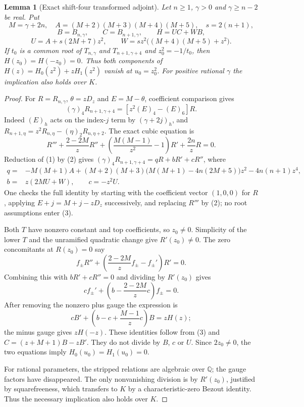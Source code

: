 \documentclass[11pt]{article}
\newtheorem{lemma}{Lemma}
\newcommand{\Q}{\mathbb Q}
\begin{document}
\begin{lemma}[Exact shift-four transformed adjoint]
\label{lem:offset-four-transform}
Let $n\ge1$, $\gamma>0$ and $\gamma\ge n-2$ be real. Put
\[
 M=\gamma+2n,\quad A=(M+2)(M+3)(M+4)(M+5),\quad s=2(n+1),
\]
\[
 B=B_{n,\gamma},\qquad C=B_{n+1,\gamma},\qquad H=UC+WB,
\]
\[
 U=A+s(2M+7)z^2,\qquad W=sz^2\bigl((M+4)(M+5)+z^2\bigr).
\]
If $t_0$ is a common root of $T_{n,\gamma}$ and
$T_{n+1,\gamma+4}$ and $z_0^2=-1/t_0$, then
$H(z_0)=H(-z_0)=0$.
Thus both components of $H(z)=H_0(z^2)+zH_1(z^2)$ vanish at
$u_0=z_0^2$. For positive rational $\gamma$ the implication
also holds over $K$.
\end{lemma}
\begin{proof}
For $R=R_{n,\gamma}$, $\theta=zD_z$ and $E=M-\theta$,
coefficient comparison gives
\[
 (\gamma)_4R_{n+1,\gamma+4}=[z^2(E)_4-(E)_6]R.       \tag{1}
\]
Indeed $(E)_h$ acts on the index-$j$ term by
$(\gamma+2j)_h$, and
$R_{n+1,\eta}=z^2R_{n,\eta}-(\eta)_2R_{n,\eta+2}$.
The exact cubic equation is
\[
 R'''+\frac{2-2M}{z}R''
 +\left(\frac{M(M-1)}{z^2}-1\right)R'
 +\frac{2n}{z}R=0.                                  \tag{2}
\]
Reduction of (1) by (2) gives
$(\gamma)_4R_{n+1,\gamma+4}=qR+bR'+cR''$, where
\[
 \begin{split}
 q={}&-M(M+1)A
 +(M+2)(M+3)\bigl(M(M+1)-4n(2M+5)\bigr)z^2
 -4n(n+1)z^4,\\
 b={}&z(2MU+W),\qquad c=-z^2U.
 \end{split}                                         \tag{3}
\]
One checks the full identity by starting with the coefficient vector
$(1,0,0)$ for $R$, applying $E+j=M+j-zD_z$ successively, and
replacing $R'''$ by (2); no root assumptions enter (3).

Both $T$ have nonzero constant and top coefficients, so $z_0\ne0$.
Simplicity of the lower $T$ and the unramified quadratic change give
$R'(z_0)\ne0$. The zero concomitants at $R(z_0)=0$ say
\[
 f_\pm R''+
 \left(\frac{2-2M}{z}f_\pm-f_\pm'\right)R'=0.
\]
Combining this with $bR'+cR''=0$ and dividing by $R'(z_0)$ gives
\[
 c f_\pm'+\left(b-\frac{2-2M}{z}c\right)f_\pm=0.
\]
After removing the nonzero plus gauge the expression is
\[
 cB'+\left(b-c+\frac{M-1}{z}c\right)B=zH(z);
\]
the minus gauge gives $zH(-z)$. These identities follow from (3)
and $C=(z+M+1)B-zB'$. They do not divide by $B$, $c$ or $U$.
Since $2z_0\ne0$, the two equations imply $H_0(u_0)=H_1(u_0)=0$.

For rational parameters, the stripped relations are algebraic over
$\Q$; the gauge factors have disappeared. The only nonvanishing
division is by $R'(z_0)$, justified by squarefreeness, which transfers
to $K$ by a characteristic-zero Bezout identity. Thus the necessary
implication also holds over $K$.
\end{proof}
\end{document}
